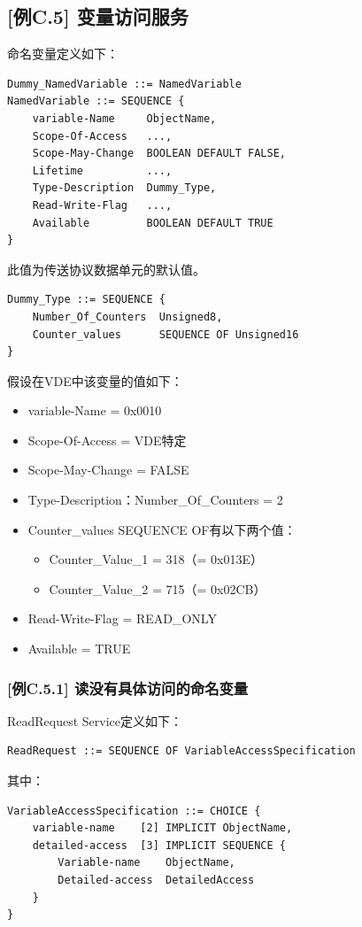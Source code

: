 \documentclass[a4paper,11pt]{ctexart}
\begin{document}
\subsection{[例C.5] 变量访问服务}

命名变量定义如下：
\begin{verbatim}
Dummy_NamedVariable ::= NamedVariable
NamedVariable ::= SEQUENCE {
    variable-Name     ObjectName,
    Scope-Of-Access   ...,
    Scope-May-Change  BOOLEAN DEFAULT FALSE,
    Lifetime          ...,
    Type-Description  Dummy_Type,
    Read-Write-Flag   ...,
    Available         BOOLEAN DEFAULT TRUE
}
\end{verbatim}

\noindent 此值为传送协议数据单元的默认值。
\begin{verbatim}
Dummy_Type ::= SEQUENCE {
    Number_Of_Counters  Unsigned8,
    Counter_values      SEQUENCE OF Unsigned16
}
\end{verbatim}

\noindent 假设在VDE中该变量的值如下：
\begin{itemize}
\item variable-Name = 0x0010
\item Scope-Of-Access = VDE特定
\item Scope-May-Change = FALSE
\item Type-Description：Number\_Of\_Counters = 2
\item Counter\_values SEQUENCE OF有以下两个值：
  \begin{itemize}
  \item Counter\_Value\_1 = 318（= 0x013E）
  \item Counter\_Value\_2 = 715（= 0x02CB）
  \end{itemize}
\item Read-Write-Flag = READ\_ONLY
\item Available = TRUE
\end{itemize}

\subsubsection{[例C.5.1] 读没有具体访问的命名变量}

ReadRequest Service定义如下：
\begin{verbatim}
ReadRequest ::= SEQUENCE OF VariableAccessSpecification
\end{verbatim}

\noindent 其中：
\begin{verbatim}
VariableAccessSpecification ::= CHOICE {
    variable-name    [2] IMPLICIT ObjectName,
    detailed-access  [3] IMPLICIT SEQUENCE {
        Variable-name    ObjectName,
        Detailed-access  DetailedAccess
    }
}
\end{verbatim}
\end{document}

